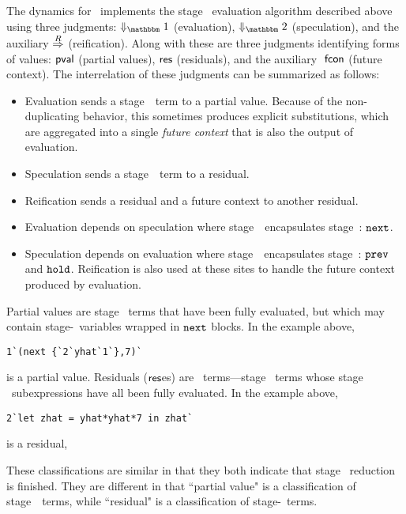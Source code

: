 The dynamics for \lang\ implements the stage \bbone\ evaluation algorithm
described above using three judgments: $\redonesym$ (evaluation), $\redtwosym$
(speculation), and the auxiliary $\overset{R}\Rightarrow$ (reification). 
Along with these are three judgments identifying forms of values:
$\mathsf{pval}$ (partial values), $\mathsf{res}$ (residuals), 
and the auxiliary $\ \mathsf{fcon}$ (future context).
The interrelation of these judgments can be summarized as follows:
\begin{itemize}
\item Evaluation sends a stage~\bbone\ term to a partial value.
Because of the non-duplicating behavior, this sometimes produces explicit substitutions,
which are aggregated into a single {\em future context} that is also the output of evaluation.
\item Speculation sends a stage~\bbtwo\ term to a residual.
\item Reification sends a residual and a future context to another residual.  
\item Evaluation depends on speculation where stage~\bbone\ encapsulates stage~\bbtwo: ${\tt next}$. 
\item Speculation depends on evaluation where stage~\bbtwo\ encapsulates stage~\bbone: ${\tt prev}$ and ${\tt hold}$.
Reification is also used at these sites to handle the future context produced by evaluation.
\end{itemize}



Partial values are stage \bbone\ terms that have been fully
evaluated, but which may contain stage-\bbtwo\ variables wrapped in ${\tt next}$
blocks.  In the example above, 
\begin{lstlisting} 
1`(next {`2`yhat`1`},7)`
\end{lstlisting}
is a partial value.
Residuals ($\mathsf{res}$es) are \langTwo\ terms---stage \bbtwo\ terms whose
stage \bbone\ subexpressions have all been fully evaluated. In the example
above,
\begin{lstlisting} 
2`let zhat = yhat*yhat*7 in zhat`
\end{lstlisting}
is a residual,



These classifications are similar in that they both indicate that stage \bbone\ reduction is finished.
They are different in that ``partial value" is a classification of stage~\bbone\ terms,
while ``residual" is a classification of stage-\bbtwo\ terms.


